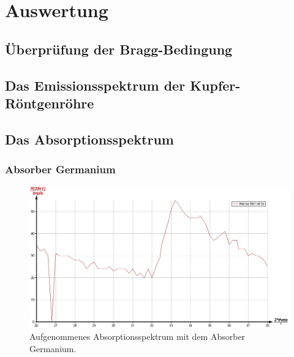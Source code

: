 \section{Auswertung}
\label{sec:Auswertung}

\subsection{Überprüfung der Bragg-Bedingung}


\subsection{Das Emissionsspektrum der Kupfer-Röntgenröhre}





\FloatBarrier
\subsection{Das Absorptionsspektrum}

\subsubsection{Absorber Germanium}
\begin{figure}
	\includegraphics{nIKO_und_jULIAN_ÜLADS/germanium.jpg}
	\caption{Aufgenommenes Absorptionsspektrum mit dem Absorber Germanium.}
	\label{fig:germanium_absorber}
\end{figure}
